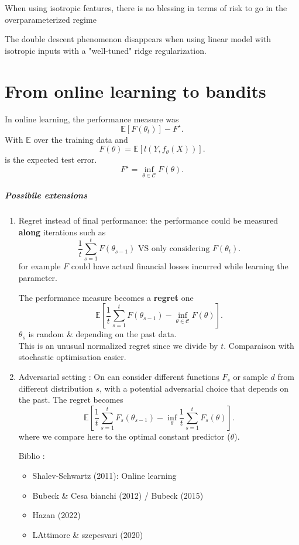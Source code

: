 \begin{note}[]
    When using isotropic features, there is no blessing in terms of risk to go in the overparameterized regime
\end{note}

\begin{note}[]
    The double descent phenomenon disappears when using linear model with isotropic inputs with a "well-tuned" ridge regularization.
\end{note}


\chapter{From online learning to bandits}
In online learning, the performance measure was 
\[
    \mathbb{E}[F(\theta _t)] - F^\star 
.\]
With $ \mathbb{E} $ over the training data and
\[
    F(\theta ) = \mathbb{E}[l(Y, f_\theta (X))]
.\]
is the expected test error. 
\[
    F^\star = \inf _{\theta \in \mathcal{C}} F(\theta )
.\]

\paragraph{Possibile extensions}
\begin{enumerate}
    \item Regret instead of final performance: the performance could be measured \textbf{along} iterations such as 
    \[
        \frac{1}{t}\sum_{s=1}^{t} F(\theta _{s-1}) \text{ VS only considering } F(\theta _t)
    .\]
    for example $ F $ could have actual financial losses incurred while learning the parameter. 

    The performance measure becomes a \textbf{regret} one 
    \[
        \mathbb{E}[ \frac{1}{t} \sum_{s=1}^{t} F(\theta _{s-1}) - \inf _{\theta \in \mathcal{C}} F(\theta ) ]
    .\]
    \warningsign $ \theta _s $ is random \& depending on the past data. \\ This is an unusual normalized regret since we divide by $ t $. Comparaison with stochastic optimisation easier. 
    \item Adversarial setting : On can consider different functions $ F_s $ or sample $ d $ from different distribution $ s $, with a potential adversarial choice that depends on the past. The regret becomes 
    \[
    \mathbb{E}[ \frac{1}{t} \sum_{s=1}^{t} F_s (\theta _{s-1}) - \inf _\theta \frac{1}{t} \sum_{s=1}^{t}F_s(\theta )]
    .\]
    where we compare here to the optimal constant predictor ($\theta $).
    
    Biblio : \begin{itemize}
        \item Shalev-Schwartz (2011): Online learning 
        \item Bubeck \& Cesa bianchi (2012) / Bubeck (2015)
        \item Hazan (2022)
        \item LAttimore \& szepesvari (2020)
    \end{itemize}
\end{enumerate}


